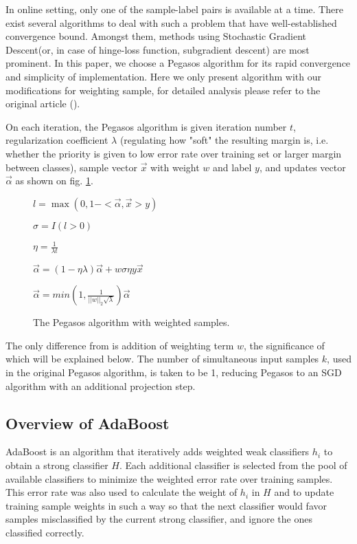 \documentclass[10pt,twocolumn, a4paper]{article}
\begin{document}
In online setting, only one of the sample-label pairs is available at a time. There exist several algorithms to deal with such a problem that have well-established convergence bound. Amongst them, methods using Stochastic Gradient Descent(or, in case of hinge-loss function, subgradient descent) are most prominent. In this paper, we choose a Pegasos algorithm for its rapid convergence and simplicity of implementation. Here we only present algorithm with our modifications for weighting sample, for detailed analysis please refer to the original article (\cite{Pegasos}).

On each iteration, the Pegasos algorithm is given  iteration number $t$,  regularization coefficient $\lambda$ (regulating how "soft" the resulting margin is, i.e. whether the priority is given to low error rate over training set or larger margin between classes), sample vector $\vec{x}$ with weight $w$ and label $y$, and updates vector $\vec{\alpha}$ as shown on fig. \ref{PegasosAl}.

\begin{figure}[ht]

\begin{algorithmic}


$l=\max (0, 1-<\vec{\alpha},\vec{x}>y)$

$\sigma=I(l>0)$

$\eta=\frac{1}{\lambda{t}}$

$\vec{\alpha}=(1-\eta\lambda)\vec{\alpha}+{w}\sigma\eta{y}{\vec{x}}$

$\vec{\alpha}=min\left(1,\frac{1}{||w||_2\sqrt{\lambda}}\right)\vec{\alpha}$
\EndFunction
\end{algorithmic}
\caption{The Pegasos algorithm with weighted samples.}
\label{PegasosAl}
\end{figure}
The only difference from \cite{Pegasos} is addition of weighting term $w$, the significance of which will be explained below. The number of simultaneous input samples $k$, used in the original Pegasos algorithm, is taken to be 1, reducing Pegasos to an SGD algorithm with an additional projection step.

\subsection{Overview of AdaBoost}
AdaBoost \cite{AdaBoost} is an algorithm that iteratively adds weighted weak classifiers $h_i$ to obtain a strong classifier $H$. Each additional classifier is selected from the pool of available classifiers to minimize the weighted error rate over training samples. This error rate was also used to calculate the weight of $h_i$ in $H$ and to update training sample weights in such a way so that the next classifier would favor samples misclassified by the current strong classifier, and ignore the ones classified correctly.
\end{document}
